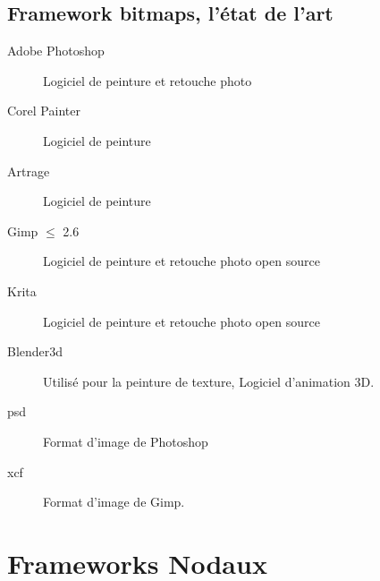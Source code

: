 		\subsection{Framework bitmaps, l'état de l'art}
			\begin{description}
				\item[Adobe Photoshop] Logiciel de peinture et retouche photo
				\item[Corel Painter] Logiciel de peinture
				\item[Artrage] Logiciel de peinture
				\item[Gimp $\leq$ 2.6] Logiciel de peinture et retouche photo open source
				\item[Krita] Logiciel de peinture et retouche photo open source
				\item[Blender3d] Utilisé pour la peinture de texture, Logiciel d'animation 3D.
				\item[psd] Format d'image de Photoshop
				\item[xcf] Format d'image de Gimp.
			\end{description}

	\section{Frameworks Nodaux}
